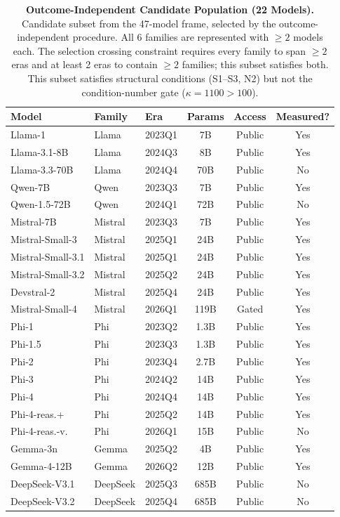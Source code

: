 \documentclass{ieeeaccess}
\theoremstyle{definition}
\theoremstyle{plain}
\begin{document}
\begin{table}[!ht]
\caption{\textbf{Outcome-Independent Candidate Population (22 Models).} Candidate subset from the 47-model frame, selected by the outcome-independent procedure. All 6 families are represented with $\geq 2$ models each. The selection crossing constraint requires every family to span $\geq 2$ eras and at least 2 eras to contain $\geq 2$ families; this subset satisfies both. This subset satisfies structural conditions (S1--S3, N2) but not the condition-number gate ($\kappa = 1100 > 100$).}
\label{tab:22model}
\centering
\scriptsize
\setlength{\tabcolsep}{3pt}
\begin{tabular}{l l l c c c}
\hline
\textbf{Model} & \textbf{Family} & \textbf{Era} & \textbf{Params} & \textbf{Access} & \textbf{Measured?} \\
\hline
Llama-1 & Llama & 2023Q1 & 7B & Public & Yes \\
\hline
Llama-3.1-8B & Llama & 2024Q3 & 8B & Public & Yes \\
\hline
Llama-3.3-70B & Llama & 2024Q4 & 70B & Public & No \\
\hline
Qwen-7B & Qwen & 2023Q3 & 7B & Public & Yes \\
\hline
Qwen-1.5-72B & Qwen & 2024Q1 & 72B & Public & No \\
\hline
Mistral-7B & Mistral & 2023Q3 & 7B & Public & Yes \\
\hline
Mistral-Small-3 & Mistral & 2025Q1 & 24B & Public & Yes \\
\hline
Mistral-Small-3.1 & Mistral & 2025Q1 & 24B & Public & Yes \\
\hline
Mistral-Small-3.2 & Mistral & 2025Q2 & 24B & Public & Yes \\
\hline
Devstral-2 & Mistral & 2025Q4 & 24B & Public & Yes \\
\hline
Mistral-Small-4 & Mistral & 2026Q1 & 119B & Gated & Yes \\
\hline
Phi-1 & Phi & 2023Q2 & 1.3B & Public & Yes \\
\hline
Phi-1.5 & Phi & 2023Q3 & 1.3B & Public & Yes \\
\hline
Phi-2 & Phi & 2023Q4 & 2.7B & Public & Yes \\
\hline
Phi-3 & Phi & 2024Q2 & 14B & Public & Yes \\
\hline
Phi-4 & Phi & 2024Q4 & 14B & Public & Yes \\
\hline
Phi-4-reas.+ & Phi & 2025Q2 & 14B & Public & Yes \\
\hline
Phi-4-reas.-v. & Phi & 2026Q1 & 15B & Public & No \\
\hline
Gemma-3n & Gemma & 2025Q2 & 4B & Public & Yes \\
\hline
Gemma-4-12B & Gemma & 2026Q2 & 12B & Public & Yes \\
\hline
DeepSeek-V3.1 & DeepSeek & 2025Q3 & 685B & Public & No \\
\hline
DeepSeek-V3.2 & DeepSeek & 2025Q4 & 685B & Public & No \\
\hline
\end{tabular}
\end{table}
\end{document}
